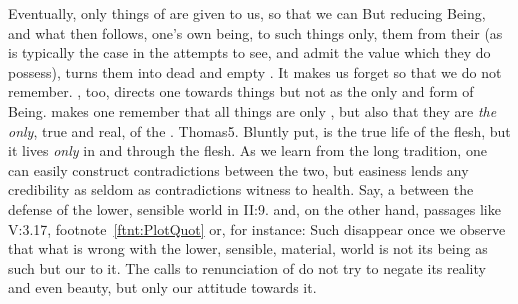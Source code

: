 \pa Eventually, only  things of  are given to us, so
that we can  But reducing Being, and what
then follows, one's own being, to such things only,  them from
their  (as is typically the case in the attempts to see,
 and admit the value which they do possess), turns them into dead
and empty . It makes us forget so that we do not remember.
, too, directs one towards  things but not as the
only and  form of Being.   makes one remember
that all  things are only , but also that they are {\em
  the only}, true and real,  of the .  \citet{Know what
  is in front of your face, and what is hidden from you will be disclosed to
  you.}{Thomas}{5.  {Bluntly put,  is the true life of the flesh, but
    it lives {\em only} in and through the flesh. As we learn from the long
    tradition, one can easily construct contradictions between the two, but
    easiness lends any credibility as seldom as contradictions witness to
    health. Say, a  between the defense of the lower,
    sensible world in \citeauthor*{Plotinus}{ II:9.}
    and, on the other hand, passages like V:3.17, footnote~\ref{ftnt:PlotQuot}
    or, for instance:  Such  disappear once
    we observe that what is wrong with the lower, sensible, material,
     world is not its being as such but our  to it.
    The calls to renunciation of  do not try to negate its
    reality and even beauty, but only our  attitude towards it.}}




